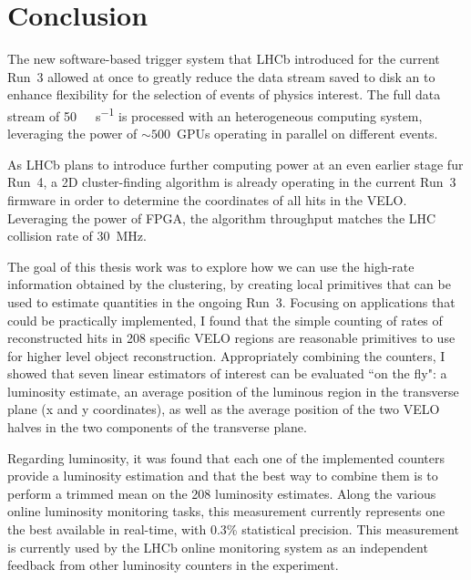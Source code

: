 
\chapter{Conclusion}
\label{chp:conclusion}
The new software-based trigger system that LHCb introduced for the current Run~3 allowed at once to greatly reduce the data stream saved to disk an to enhance flexibility for the selection of events of physics interest. The full data stream of \SI{50}{\tera\byte\per\second} is processed with an heterogeneous computing system, leveraging the power of $\sim 500$~GPUs operating in parallel on different events.

As LHCb plans to introduce further computing power at an even earlier stage fur Run~4, a 2D cluster-finding algorithm is already operating in the current Run~3 firmware in order to determine the coordinates of all hits in the VELO. Leveraging the power of FPGA, the algorithm throughput matches the LHC collision rate of \SI{30}{\mega\hertz}.

The goal of this thesis work was to explore how we can use the high-rate information obtained by the clustering, by creating local primitives that can be used to estimate quantities in the ongoing Run~3.
Focusing on applications that could be practically implemented, I found that the simple counting of rates of reconstructed hits in 208 specific VELO regions are reasonable primitives to use for higher level object reconstruction. Appropriately combining the counters, I showed that seven linear estimators of interest can be evaluated ``on the fly": a luminosity estimate, an average position of the luminous region in the transverse plane (x and y coordinates), as well as the average position of the two VELO halves in the two components of the transverse plane.

Regarding luminosity, it was found that each one of the implemented counters provide a luminosity estimation and that the best way to combine them is to perform a trimmed mean on the 208 luminosity estimates. Along the various online luminosity monitoring tasks, this measurement currently represents one the best available in real-time, with 0.3\% statistical precision. This measurement is currently used by the LHCb online monitoring system as an independent feedback from other luminosity counters in the experiment.

